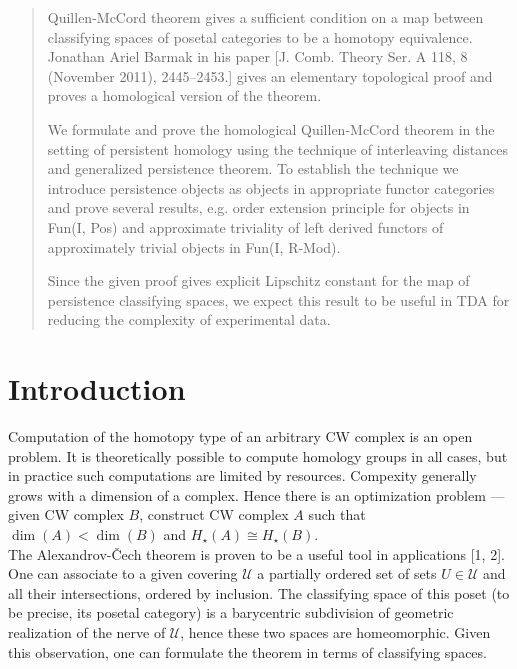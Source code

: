 \documentclass[english,12pt]{article}
\numberwithin{equation}{section}
\theoremstyle{definition}
\theoremstyle{remark}
\begin{document}
\begin{abstract}
Quillen-McCord theorem gives a sufficient condition on a map between classifying spaces of posetal categories to be a homotopy equivalence. Jonathan Ariel Barmak in his paper [J. Comb. Theory Ser. A 118, 8 (November 2011), 2445–2453.] gives an elementary topological proof and proves a homological version of the theorem.

We formulate and prove the homological Quillen-McCord theorem in the setting of persistent homology using the technique of interleaving distances and generalized persistence theorem. To establish the technique we introduce persistence objects as objects in appropriate functor categories and prove several results, e.g. order extension principle for objects in Fun(I, Pos) and approximate triviality of left derived functors of approximately trivial objects in Fun(I, R-Mod).

Since the given proof gives explicit Lipschitz constant for the map of persistence classifying spaces, we expect this result to be useful in TDA for reducing the complexity of experimental data.
\end{abstract}


\section{Introduction}

Computation of the homotopy type of an arbitrary CW complex is an open problem. It is theoretically possible to compute homology groups in all cases, but in practice such computations are limited by resources. Compexity generally grows with a dimension of a complex. Hence there is an optimization problem --- given CW complex $B$, construct CW complex $A$ such that $\operatorname{dim}(A) < \operatorname{dim}(B)$ and $H_{\star}(A) \cong H_{\star}(B)$.\\

The Alexandrov-\v{C}ech theorem is proven to be a useful tool in applications [1, 2]. One can associate to a given covering $\mathcal{U}$ a partially ordered set of sets $U \in \mathcal{U}$ and all their intersections, ordered by inclusion. The classifying space of this poset (to be precise, its posetal category) is a barycentric subdivision of geometric realization of the nerve of $\mathcal{U}$, hence these two spaces are homeomorphic. Given this observation, one can formulate the theorem in terms of classifying spaces.\\
\end{document}
